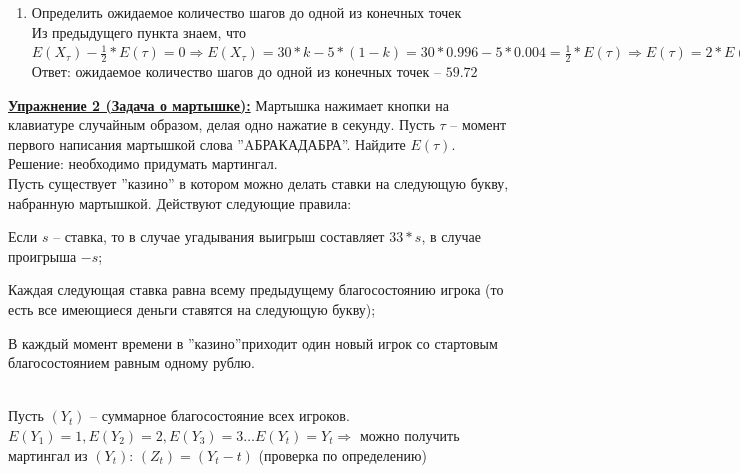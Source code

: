 \documentclass[a4paper]{article}
\begin{document}
\begin{enumerate}[label={\alph*)}]
\\ При этом ${X}_{\tau}$ -- случайная величина, координата конечной точки улитки:
\begin{table}[h]
\centering
\begin{tabular}{l|c|c}
${X}_{\tau}$ & $30$ & $-5$ \\ \hline
$p$ & $k$ & $1-k$
\end{tabular}
\end{table}
\\ Где ''$k$'' -- искомая вероятность
\\ Таким образом, $E({R}_{\tau})=E({\frac{1}{3}}^{{X}_{\tau}})=k*{\frac{1}{3}^{30}}+(1-k)*{\frac{1}{3}^{-5}}=1 \Rightarrow k*{3^{-30}}+(1-k)*{3^{5}}=1 \Rightarrow k*({3^{5}}-{3^{-30}})=3^{5}-1 \Rightarrow k\approx0.996$
\\ Ответ:  $Pr(\text{улитка дойдет до точки ''30''})=0.996$
\item Определить ожидаемое количество шагов до одной из конечных точек
\\ Из предыдущего пункта знаем, что $E({X}_{\tau})-\frac{1}{2}*E(\tau)=0 \Rightarrow E({X}_{\tau})=30*k-5*(1-k)=30*0.996-5*0.004=\frac{1}{2}*E(\tau) \Rightarrow E(\tau)=2*E({X}_{\tau})=60*0.996-10*0.004=59.72$
\\ Ответ: ожидаемое количество шагов до одной из конечных точек -- $59.72$
\end{enumerate}
\par {\bf\underline{Упражнение 2 (Задача о мартышке):}} Мартышка нажимает кнопки на клавиатуре случайным образом, делая одно нажатие в секунду. Пусть $\tau$ -- момент первого написания мартышкой слова ''AБРАКАДАБРА''. Найдите $E(\tau)$.
\\Решение: необходимо придумать мартингал. \\ Пусть существует ''казино'' в котором можно делать ставки на следующую букву, набранную мартышкой. Действуют следующие правила: \begin{enumerate*}[font={\color{red!50!black}\bfseries}] \item Если $s$ -- ставка, то в случае угадывания выигрыш составляет $33*s$, в случае проигрыша $-s$; \ \item Каждая следующая ставка равна всему предыдущему благосостоянию игрока (то есть все имеющиеся деньги ставятся на следующую букву); \ \item В каждый момент времени в ''казино''приходит один новый игрок со стартовым благосостоянием равным одному рублю. \end{enumerate*}
\\ Пусть $({Y}_{t})$ -- суммарное благосостояние всех игроков. $E({Y}_{1})=1, E({Y}_{2})=2, E({Y}_{3})=3 \dots E({Y}_{t})={Y}_{t} \Rightarrow$ можно получить мартингал из  $({Y}_{t})$:  $({Z}_{t})=({Y}_{t}-t)$ (проверка по определению)
\end{document}
